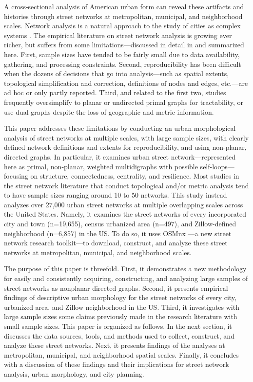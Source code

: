\documentclass{article}
\begin{document}
A cross-sectional analysis of American urban form can reveal these artifacts and histories through street networks at metropolitan, municipal, and neighborhood scales. Network analysis is a natural approach to the study of cities as complex systems \cite{masucci_random_2009}. The empirical literature on street network analysis is growing ever richer, but suffers from some limitations---discussed in detail in \cite{boeing_osmnx:_2017} and summarized here. First, sample sizes have tended to be fairly small due to data availability, gathering, and processing constraints. Second, reproducibility has been difficult when the dozens of decisions that go into analysis---such as spatial extents, topological simplification and correction, definitions of nodes and edges, etc.---are ad hoc or only partly reported. Third, and related to the first two, studies frequently oversimplify to planar or undirected primal graphs for tractability, or use dual graphs despite the loss of geographic and metric information. 

This paper addresses these limitations by conducting an urban morphological analysis of street networks at multiple scales, with large sample sizes, with clearly defined network definitions and extents for reproducibility, and using non-planar, directed graphs. In particular, it examines urban street network---represented here as primal, non-planar, weighted multidigraphs with possible self-loops---focusing on structure, connectedness, centrality, and resilience. Most studies in the street network literature that conduct topological and/or metric analysis tend to have sample sizes ranging around 10 to 50 networks. This study instead analyzes over 27,000 urban street networks at multiple overlapping scales across the United States. Namely, it examines the street networks of every incorporated city and town (n=19,655), census urbanized area (n=497), and Zillow-defined neighborhood (n=6,857) in the US. To do so, it uses OSMnx \cite{boeing_osmnx:_2017}---a new street network research toolkit---to download, construct, and analyze these street networks at metropolitan, municipal, and neighborhood scales.

The purpose of this paper is threefold. First, it demonstrates a new methodology for easily and consistently acquiring, constructing, and analyzing large samples of street networks as nonplanar directed graphs. Second, it presents empirical findings of descriptive urban morphology for the street networks of every city, urbanized area, and Zillow neighborhood in the US. Third, it investigates with large sample sizes some claims previously made in the research literature with small sample sizes. This paper is organized as follows. In the next section, it discusses the data sources, tools, and methods used to collect, construct, and analyze these street networks. Next, it presents findings of the analyses at metropolitan, municipal, and neighborhood spatial scales. Finally, it concludes with a discussion of these findings and their implications for street network analysis, urban morphology, and city planning.
\end{document}
